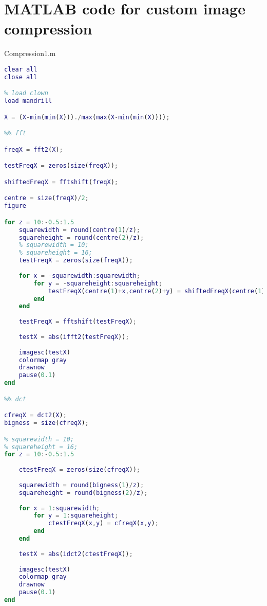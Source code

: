 \lstset{numbers=left,
numberstyle=\footnotesize, 
stepnumber=2,numbersep=5pt}

\section{MATLAB code for custom image compression}

Compression1.m
\begin{lstlisting}[language=Matlab, label = lst:cust_comp1, caption = {Whole image, transform based compression code}]
clear all
close all

% load clown
load mandrill

X = (X-min(min(X)))./max(max(X-min(min(X))));

%% fft

freqX = fft2(X);

testFreqX = zeros(size(freqX));

shiftedFreqX = fftshift(freqX);

centre = size(freqX)/2;
figure

for z = 10:-0.5:1.5
    squarewidth = round(centre(1)/z);
    squareheight = round(centre(2)/z);
    % squarewidth = 10;
    % squareheight = 16;
    testFreqX = zeros(size(freqX));
    
    for x = -squarewidth:squarewidth;
        for y = -squareheight:squareheight;
            testFreqX(centre(1)+x,centre(2)+y) = shiftedFreqX(centre(1)+x,centre(2)+y);
        end
    end
    
    testFreqX = fftshift(testFreqX);
    
    testX = abs(ifft2(testFreqX));
    
    imagesc(testX)
    colormap gray
    drawnow
    pause(0.1)
end

%% dct

cfreqX = dct2(X);
bigness = size(cfreqX);

% squarewidth = 10;
% squareheight = 16;
for z = 10:-0.5:1.5
    
    ctestFreqX = zeros(size(cfreqX));
    
    squarewidth = round(bigness(1)/z);
    squareheight = round(bigness(2)/z);
    
    for x = 1:squarewidth;
        for y = 1:squareheight;
            ctestFreqX(x,y) = cfreqX(x,y);
        end
    end
    
    testX = abs(idct2(ctestFreqX));
    
    imagesc(testX)
    colormap gray
    drawnow
    pause(0.1)
end
\end{lstlisting}

